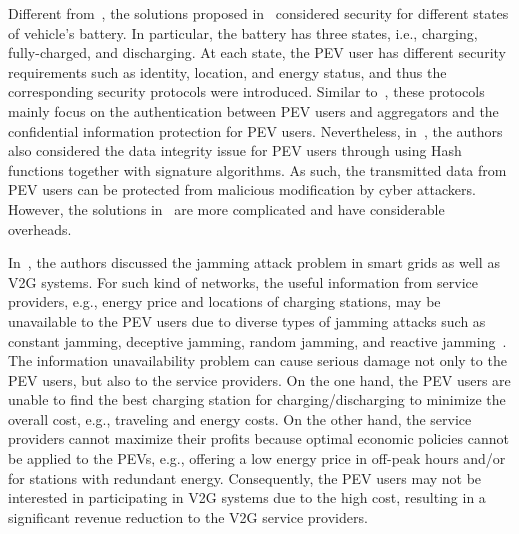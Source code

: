 \documentclass[twocolumn,10pt]{IEEEtran}
\begin{document}
Different from~\cite{Yang2011P2}, the solutions proposed in~\cite{Liu2014Role} considered security for different states of vehicle's battery. In particular, the battery has three states, i.e., charging, fully-charged, and discharging. At each state, the PEV user has different security requirements such as identity, location, and energy status, and thus the corresponding security protocols were introduced. Similar to~\cite{Yang2011P2}, these protocols mainly focus on the authentication between PEV users and aggregators and the confidential information protection for PEV users. Nevertheless, in~\cite{Liu2014Role}, the authors also considered the data integrity issue for PEV users through using Hash functions together with signature algorithms. As such, the transmitted data from PEV users can be protected from malicious modification by cyber attackers. However, the solutions in~\cite{Liu2014Role} are more complicated and have considerable overheads.

In~\cite{Shuaib2016CognitiveRadio}, the authors discussed the jamming attack problem in smart grids as well as V2G systems. For such kind of networks, the useful information from service providers, e.g., energy price and locations of charging stations, may be unavailable to the PEV users due to diverse types of jamming attacks such as constant jamming, deceptive jamming, random jamming, and reactive jamming~\cite{Xu2005The feasibility}. The information unavailability problem can cause serious damage not only to the PEV users, but also to the service providers. On the one hand, the PEV users are unable to find the best charging station for charging/discharging to minimize the overall cost, e.g., traveling and energy costs. On the other hand, the service providers cannot maximize their profits because optimal economic policies cannot be applied to the PEVs, e.g., offering a low energy price in off-peak hours and/or for stations with redundant energy. Consequently, the PEV users may not be interested in participating in V2G systems due to the high cost, resulting in a significant revenue reduction to the V2G service providers. 
\end{document}
